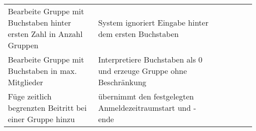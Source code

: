 \begin{table}[]
\begin{tabular}{p{6cm}p{7cm}p{3cm}llll}
		Bearbeite Gruppe mit Buchstaben hinter ersten Zahl in Anzahl Gruppen                                                                 & System ignoriert Eingabe hinter dem ersten Buchstaben                                                                                                           & \checkmark           &  &  &  \\
		Bearbeite Gruppe mit Buchstaben in max. Mitglieder                                                                                    & Interpretiere Buchstaben als 0 und erzeuge Gruppe ohne Beschränkung                                                                                                & \checkmark           &  &  &  \\
		Füge zeitlich begrenzten Beitritt bei einer Gruppe hinzu                                                                              & übernimmt den festgelegten Anmeldezeitraumstart und -ende                                                                                                         & \checkmark           &  &  &  \\
	
		
	\end{tabular}
\end{table}
